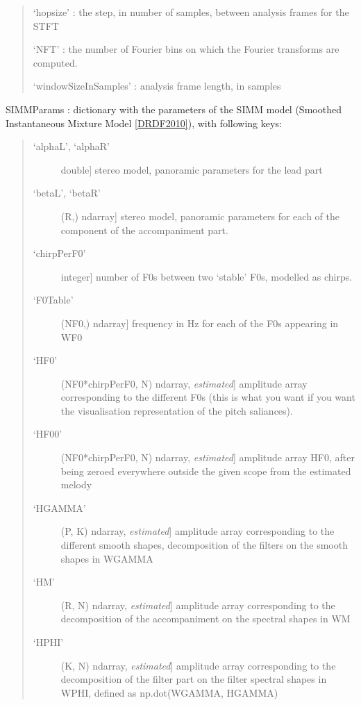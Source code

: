 \documentclass[letterpaper,10pt,english]{sphinxmanual}
\begin{document}
\begin{fulllineitems}
\begin{description}
\begin{quote}
`hopsize' : the step, in number of samples, between analysis
frames for the STFT

`NFT' : the number of Fourier bins on which the Fourier transforms
are computed.

`windowSizeInSamples' : analysis frame length, in samples
\end{quote}

SIMMParams : dictionary with the parameters of the SIMM model
(Smoothed Instantaneous Mixture Model {\hyperref[reference/separateleadstereo:drdf2010]{{[}DRDF2010{]}}}), with following keys:
\begin{quote}
\begin{description}
\item[{`alphaL', `alphaR'}] \leavevmode{[}double{]}
stereo model, panoramic parameters for the lead part

\item[{`betaL', `betaR'}] \leavevmode{[}(R,) ndarray{]}
stereo model, panoramic parameters for each of the component of
the accompaniment part.

\item[{`chirpPerF0'}] \leavevmode{[}integer{]}
number of F0s between two `stable' F0s, modelled
as chirps.

\item[{`F0Table'}] \leavevmode{[}(NF0,) ndarray{]}
frequency in Hz for each of the F0s appearing in WF0

\item[{`HF0'}] \leavevmode{[}(NF0*chirpPerF0, N) ndarray, \emph{estimated}{]}
amplitude array corresponding to the different F0s (this is
what you want if you want the visualisation representation of
the pitch saliances).

\item[{`HF00'}] \leavevmode{[}(NF0*chirpPerF0, N) ndarray, \emph{estimated}{]}
amplitude array HF0, after being zeroed everywhere outside
the given scope from the estimated melody

\item[{`HGAMMA'}] \leavevmode{[}(P, K) ndarray, \emph{estimated}{]}
amplitude array corresponding to the different smooth shapes,
decomposition of the filters on the smooth shapes in WGAMMA

\item[{`HM'}] \leavevmode{[}(R, N) ndarray, \emph{estimated}{]}
amplitude array corresponding to the decomposition of the
accompaniment on the spectral shapes in WM

\item[{`HPHI'}] \leavevmode{[}(K, N) ndarray, \emph{estimated}{]}
amplitude array corresponding to the decomposition of the
filter part on the filter spectral shapes in WPHI, defined
as np.dot(WGAMMA, HGAMMA)


\end{description}
\end{quote}
\end{description}
\end{fulllineitems}
\end{document}
